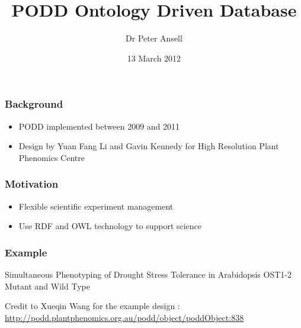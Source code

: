 \documentclass[12pt]{beamer}
\title{PODD Ontology Driven Database}
\author{Dr Peter Ansell}
\institute{University of Queensland}
\date{13 March 2012}
\begin{document}
\begin{frame}
\titlepage
\end{frame}


\begin{frame}
\frametitle{Background} 

\begin{itemize}
 \item PODD implemented between 2009 and 2011
 \item Design by Yuan Fang Li and Gavin Kennedy for High Resolution Plant Phenomics Centre
\end{itemize}

\end{frame}

\begin{frame}
\frametitle{Motivation} 

\begin{itemize}
 \item Flexible scientific experiment management
 \item Use RDF and OWL technology to support science
\end{itemize}


\end{frame}

\begin{frame}
\frametitle{Example} 

Simultaneous Phenotyping of Drought Stress Tolerance in Arabidopsis OST1-2 Mutant and Wild Type 

\vskip 12pt


Credit to Xueqin Wang for the example design : \url{http://podd.plantphenomics.org.au/podd/object/poddObject:838}

\end{frame}

\bgroup
{}
\begin{frame}[plain]{}
\end{frame}
\egroup
\end{document}

